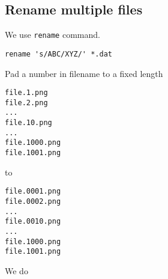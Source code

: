 \subsection{Rename multiple files}

We use \verb!rename! command.
\begin{verbatim}
rename 's/ABC/XYZ/' *.dat
\end{verbatim}

Pad a number in filename to a fixed length
\begin{verbatim}
file.1.png
file.2.png
...
file.10.png
...
file.1000.png
file.1001.png
\end{verbatim}
to
\begin{verbatim}
file.0001.png
file.0002.png
...
file.0010.png
...
file.1000.png
file.1001.png
\end{verbatim}
We do
